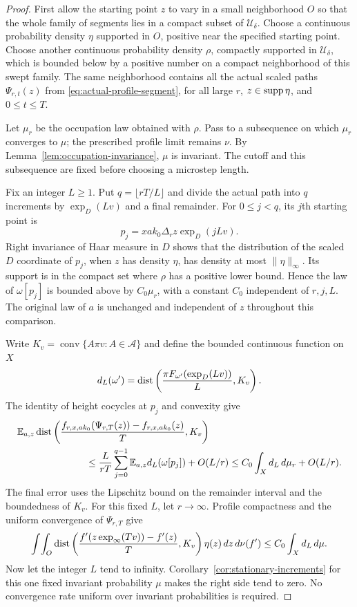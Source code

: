 \begin{proof}
First allow the starting point $z$ to vary in a small neighborhood
$O$ so that the whole family of segments lies in a compact subset
of $\mathcal U_\delta$.  Choose a continuous probability density
$\eta$ supported in $O$, positive near the specified starting point.
Choose another continuous probability density $\rho$, compactly
supported in $\mathcal U_\delta$, which is bounded below by a
positive number on a compact neighborhood of this swept family.
The same neighborhood contains all the actual scaled paths
$\Psi_{r,t}(z)$ from \eqref{eq:actual-profile-segment}, for all large
$r$, $z\in\operatorname{supp}\eta$, and $0\le t\le T$.

Let $\mu_r$ be the occupation law obtained with $\rho$.  Pass to a
subsequence on which $\mu_r$ converges to $\mu$; the prescribed
profile limit remains $\nu$.  By Lemma~\ref{lem:occupation-invariance},
$\mu$ is invariant.  The cutoff and this subsequence are fixed
before choosing a microstep length.

Fix an integer $L\ge1$.  Put $q=\lfloor rT/L\rfloor$ and divide the
actual path into $q$ increments by $\exp_D(Lv)$ and a final remainder.
For $0\le j<q$, its $j$th starting point is
\[
 p_j=xak_0\Delta_r z\exp_D(jLv).
\]
Right invariance of Haar measure in $D$ shows that the distribution
of the scaled $D$ coordinate of $p_j$, when $z$ has density $\eta$,
has density at most $\|\eta\|_\infty$.  Its support is in the
compact set where $\rho$ has a positive lower bound.  Hence the
law of $\omega[p_j]$ is bounded above by $C_0\mu_r$, with a constant
$C_0$ independent of $r,j,L$.  The original law of $a$ is unchanged
and independent of $z$ throughout this comparison.

Write $K_v=\operatorname{conv}\{A\pi v:A\in\mathcal A\}$ and define
the bounded continuous function on $X$
\[
 d_L(\omega')=
 \operatorname{dist}\left(\frac{\pi F_{\omega'}(\exp_D(Lv))}{L},K_v\right).
\]
The identity of height cocycles at $p_j$ and convexity give
\begin{align*}
 &\mathbb E_{a,z}\dist\left(
 \frac{f_{r,x,ak_0}(\Psi_{r,T}(z))-f_{r,x,ak_0}(z)}{T},K_v\right)
 \\
 &\hspace{25mm}\le
   \frac{L}{rT}\sum_{j=0}^{q-1}\mathbb E_{a,z}d_L(\omega[p_j])
       +O(L/r)
 \le C_0\int_X d_L\,d\mu_r+O(L/r).
\end{align*}
The final error uses the Lipschitz bound on the remainder interval
and the boundedness of $K_v$.  For this fixed $L$, let $r\to\infty$.
Profile compactness and the uniform convergence of $\Psi_{r,T}$ give
\[
 \int\!\int_O
 \operatorname{dist}\left(\frac{f'(z\exp_\infty(Tv))-f'(z)}{T},K_v\right)
      \eta(z)\,dz\,d\nu(f')
 \le C_0\int_X d_L\,d\mu.
\]
Now let the integer $L$ tend to infinity.
Corollary~\ref{cor:stationary-increments} for this one fixed invariant
probability $\mu$ makes the right side tend to zero.  No convergence
rate uniform over invariant probabilities is required.


\end{proof}
